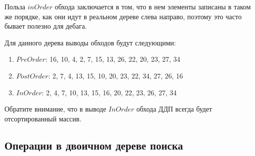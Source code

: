 Польза $inOrder$ обхода заключается в том, что в нем элементы записаны в таком же порядке, как они идут в реальном дереве слева направо, поэтому это часто бывает полезно для дебага.

\begin{example}
    Для данного дерева выводы обходов будут следующими: \\
    \begin{figure}[htbp]
        \begin{center} 
        \end{center}
    \end{figure}
    \begin{enumerate}
        \item $PreOrder$: 16, 10, 4, 2, 7, 15, 13, 26, 22, 20, 23, 27, 34
        \item $PostOrder$: 2, 7, 4, 13, 15, 10, 20, 23, 22, 34, 27, 26, 16
        \item $InOrder$: 2, 4, 7, 10, 13, 15, 16, 20, 22, 23, 26, 27, 34
    \end{enumerate}
    Обратите внимание, что в выводе $InOrder$ обхода ДДП всегда будет отсортированный массив.
\end{example}



\subsection{Операции в двоичном дереве поиска}




